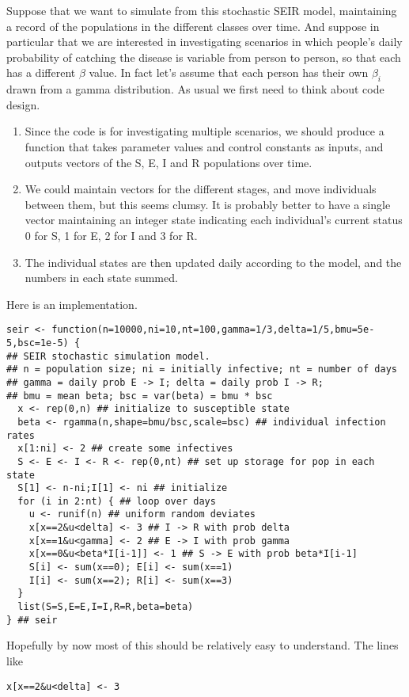 \documentclass[10pt] {article}
\theoremstyle{definition}
\begin{document}
Suppose that we want to simulate from this stochastic SEIR model, maintaining a record of the populations in the different classes over time. And suppose in particular that we are interested in investigating scenarios in which people's daily probability of catching the disease is variable from person to person, so that each has a different $\beta$ value. In fact let's assume that each person has their own $\beta_i$ drawn from a gamma distribution. As usual we first need to think about code design. 
\begin{enumerate}
\item Since the code is for investigating multiple scenarios, we should produce a function that takes parameter values and control constants as inputs, and outputs vectors of the S, E, I and R populations over time.
\item We could maintain vectors for the different stages, and move individuals between them, but this seems clumsy. It is probably better to have a single vector maintaining an integer state indicating each individual's current status 0 for S, 1 for E, 2 for I and 3 for R.
\item The individual states are then updated daily according to the model, and the numbers in each state summed. 
\end{enumerate}    
Here is an implementation. 
\begin{lstlisting}
seir <- function(n=10000,ni=10,nt=100,gamma=1/3,delta=1/5,bmu=5e-5,bsc=1e-5) {
## SEIR stochastic simulation model.
## n = population size; ni = initially infective; nt = number of days
## gamma = daily prob E -> I; delta = daily prob I -> R;
## bmu = mean beta; bsc = var(beta) = bmu * bsc
  x <- rep(0,n) ## initialize to susceptible state
  beta <- rgamma(n,shape=bmu/bsc,scale=bsc) ## individual infection rates
  x[1:ni] <- 2 ## create some infectives
  S <- E <- I <- R <- rep(0,nt) ## set up storage for pop in each state
  S[1] <- n-ni;I[1] <- ni ## initialize
  for (i in 2:nt) { ## loop over days
    u <- runif(n) ## uniform random deviates
    x[x==2&u<delta] <- 3 ## I -> R with prob delta
    x[x==1&u<gamma] <- 2 ## E -> I with prob gamma
    x[x==0&u<beta*I[i-1]] <- 1 ## S -> E with prob beta*I[i-1]
    S[i] <- sum(x==0); E[i] <- sum(x==1)
    I[i] <- sum(x==2); R[i] <- sum(x==3)
  }
  list(S=S,E=E,I=I,R=R,beta=beta)
} ## seir
\end{lstlisting}
Hopefully by now most of this should be relatively easy to understand. The lines like 
\begin{lstlisting}
x[x==2&u<delta] <- 3 
\end{lstlisting}
\end{document}
